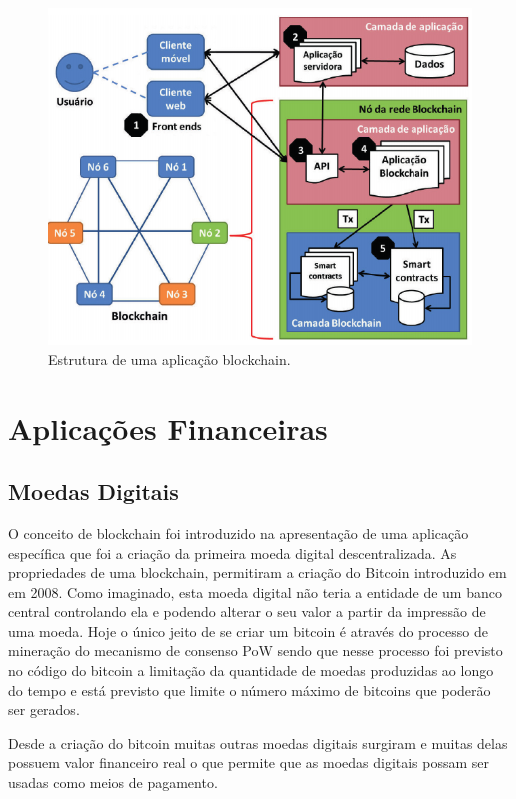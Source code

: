 \documentclass[12pt]{article}
\begin{document}
\begin{figure}[H]
    \centering
    \includegraphics[scale=0.7]{Imagens/estrutura_dapp.png}
    \caption{Estrutura de uma aplicação blockchain.}
    \label{fig:aplicacao_blockchain}
\end{figure}

\section{Aplicações Financeiras}
\subsection{Moedas Digitais}

O conceito de blockchain foi introduzido na apresentação de uma aplicação específica que foi a criação da primeira moeda digital descentralizada. As propriedades de uma blockchain, permitiram a criação do Bitcoin introduzido em \cite{nakamoto2008peer} em 2008. Como imaginado, esta moeda digital não teria a entidade de um banco central controlando ela e podendo alterar o seu valor a partir da impressão de uma moeda. Hoje o único jeito de se criar um bitcoin é através do processo de mineração do mecanismo de consenso PoW sendo que nesse processo foi previsto no código do bitcoin a limitação da quantidade de moedas produzidas ao longo do tempo e está previsto que limite o número máximo de bitcoins que poderão ser gerados.

Desde a criação do bitcoin muitas outras moedas digitais surgiram e muitas delas possuem valor financeiro real o que permite que as moedas digitais possam ser usadas como meios de pagamento. 
\end{document}
